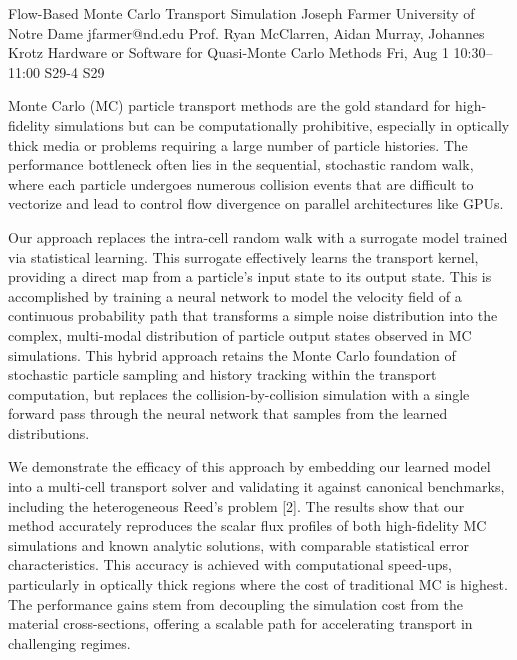 \documentclass[12pt,lettersize,oneside]{book} %
\begin{document}
\begin{talk}
  {Flow-Based Monte Carlo Transport Simulation}%
  {Joseph Farmer}%
  {University of Notre Dame}%
  {jfarmer@nd.edu}%
  {Prof. Ryan McClarren, Aidan Murray, Johannes Krotz}%
  {Hardware or Software for Quasi-Monte Carlo Methods}%
  {Fri, Aug 1 10:30--11:00}%
  {S29-4}%
  {S29}%

Monte Carlo (MC) particle transport methods are the gold standard for high-fidelity simulations but can be computationally prohibitive, especially in optically thick media or problems requiring a large number of particle histories. The performance bottleneck often lies in the sequential, stochastic random walk, where each particle undergoes numerous collision events that are difficult to vectorize and lead to control flow divergence on parallel architectures like GPUs.

Our approach replaces the intra-cell random walk with a surrogate model trained via statistical learning. This surrogate effectively learns the transport kernel, providing a direct map from a particle's input state to its output state. This is accomplished by training a neural network to model the velocity field of a continuous probability path that transforms a simple noise distribution into the complex, multi-modal distribution of particle output states observed in MC simulations. This hybrid approach retains the Monte Carlo foundation of stochastic particle sampling and history tracking within the transport computation, but replaces the collision-by-collision simulation with a single forward pass through the neural network that samples from the learned distributions.

We demonstrate the efficacy of this approach by embedding our learned model into a multi-cell transport solver and validating it against canonical benchmarks, including the heterogeneous Reed's problem [2]. The results show that our method accurately reproduces the scalar flux profiles of both high-fidelity MC simulations and known analytic solutions, with comparable statistical error characteristics. This accuracy is achieved with  computational speed-ups, particularly in optically thick regions where the cost of traditional MC is highest. The performance gains stem from decoupling the simulation cost from the material cross-sections, offering a scalable path for accelerating transport in challenging regimes. 


\end{talk}
\end{document}
